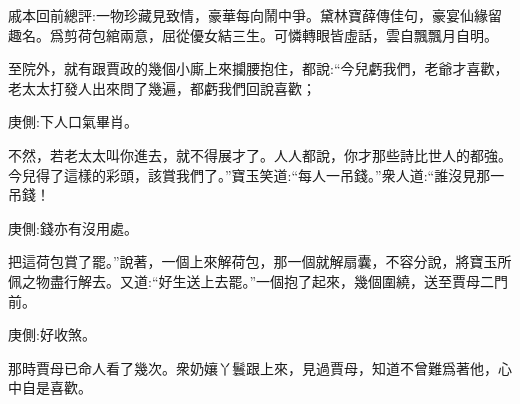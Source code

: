 
\begin{parag}
    \begin{note}戚本回前總評:一物珍藏見致情，豪華每向鬧中爭。黛林寶薛傳佳句，豪宴仙緣留趣名。爲剪荷包綰兩意，屈從優女結三生。可憐轉眼皆虛話，雲自飄飄月自明。\end{note}
\end{parag}


\begin{parag}
    至院外，就有跟賈政的幾個小廝上來攔腰抱住，都說:“今兒虧我們，老爺才喜歡，老太太打發人出來問了幾遍，都虧我們回說喜歡；\begin{note}庚側:下人口氣畢肖。\end{note}不然，若老太太叫你進去，就不得展才了。人人都說，你才那些詩比世人的都強。今兒得了這樣的彩頭，該賞我們了。”寶玉笑道:“每人一吊錢。”衆人道:“誰沒見那一吊錢！\begin{note}庚側:錢亦有沒用處。\end{note}把這荷包賞了罷。”說著，一個上來解荷包，那一個就解扇囊，不容分說，將寶玉所佩之物盡行解去。又道:“好生送上去罷。”一個抱了起來，幾個圍繞，送至賈母二門前。\begin{note}庚側:好收煞。\end{note}那時賈母已命人看了幾次。衆奶孃丫鬟跟上來，見過賈母，知道不曾難爲著他，心中自是喜歡。
\end{parag}


